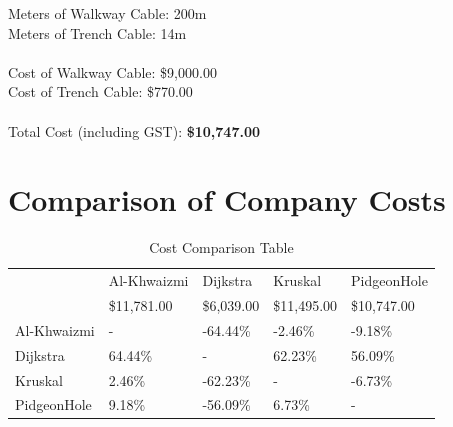 \documentclass[11pt]{book}
\renewcommand{\=}[1]{\stackrel{#1}{=}} %
\theoremstyle{definition}
\theoremstyle{remark}
\begin{document}
Meters of Walkway Cable: 200m \\
Meters of Trench Cable:	14m \\
\\
Cost of Walkway Cable: \$9,000.00 \\
Cost of Trench Cable: \$770.00\\
\\
Total Cost (including GST): \textbf{\$10,747.00} \\

\newpage
\section{Comparison of Company Costs}

\begin{table}[]
\begin{tabular}{lllll}
 & Al-Khwaizmi & Dijkstra & Kruskal & PidgeonHole \\
 & \$11,781.00 & \$6,039.00 & \$11,495.00 & \$10,747.00 \\
Al-Khwaizmi & - & \cellcolor[HTML]{9AFF99}-64.44\% & \cellcolor[HTML]{9AFF99}-2.46\% & \cellcolor[HTML]{9AFF99}-9.18\% \\
Dijkstra & \cellcolor[HTML]{FFCCC9}64.44\% & - & \cellcolor[HTML]{FFCCC9}62.23\% & \cellcolor[HTML]{FFCCC9}56.09\% \\
Kruskal & \cellcolor[HTML]{FFCCC9}2.46\% & \cellcolor[HTML]{9AFF99}-62.23\% & - & \cellcolor[HTML]{9AFF99}-6.73\% \\
PidgeonHole & \cellcolor[HTML]{FFCCC9}9.18\% & \cellcolor[HTML]{9AFF99}-56.09\% & \cellcolor[HTML]{FFCCC9}6.73\% & -
\end{tabular}
\caption{Cost Comparison Table}
\label{tab:my-table}
\end{table}
\end{document}
